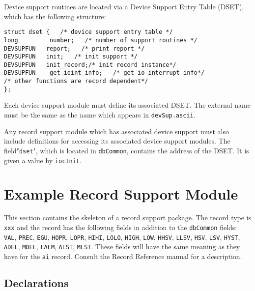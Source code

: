 Device support routines are located via a Device Support Entry Table (DSET), which has the following structure:

\begin{verbatim}struct dset {   /* device support entry table */
long         number;   /* number of support routines */
DEVSUPFUN   report;   /* print report */
DEVSUPFUN   init;   /* init support */
DEVSUPFUN   init_record;/* init record instance*/
DEVSUPFUN    get_ioint_info;   /* get io interrupt info*/
/* other functions are record dependent*/
};
\end{verbatim}Each device support module must define its associated DSET. The external name must be the same as the name which 
appears in \verb|devSup.ascii|.

Any record support module which has associated device support must also include definitions for accessing its associated 
device support modules. The field"\verb|dset|", which is located in \verb|dbCommon|, contains the address of the DSET. It is given a 
value by \verb|iocInit|.

\section{Example Record Support Module}

This section contains the skeleton of a record support package. The record type is \verb|xxx| and the record has the following 
fields in addition to the \verb|dbCommon| fields: \verb|VAL|, \verb|PREC|, \verb|EGU|, \verb|HOPR|, \verb|LOPR|, \verb|HIHI|, \verb|LOLO|, \verb|HIGH|, \verb|LOW|, \verb|HHSV|, \verb|LLSV|, \verb|HSV|, 
\verb|LSV|, \verb|HYST|, \verb|ADEL|, \verb|MDEL|, \verb|LALM|, \verb|ALST|, \verb|MLST|. These fields will have the same meaning as they have for the \verb|ai| record. 
Consult the Record Reference manual for a description. 

\subsection{Declarations}

